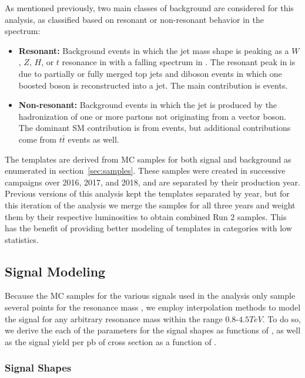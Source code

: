 As mentioned previously, two main classes of background are considered for this analysis, as classified based on resonant or non-resonant behavior in the \MJ spectrum:
\begin{itemize}
  \item \textbf{Resonant:} Background events in which the jet mass shape is peaking as a $W$, $Z$, $H$, or $t$ resonance in \MJ with a falling spectrum in \MVV.
  The resonant peak in \MJ is due to partially or fully merged top jets and diboson events in which one boosted boson is reconstructed into a jet.
  The main contribution is \WVt events.
  \item \textbf{Non-resonant:} Background events in which the jet is produced by the hadronization of one or more partons not originating from a vector boson.
  The dominant SM contribution is from \Wjets events, but additional contributions come from $t\bar{t}$ events as well.
\end{itemize}

The templates are derived from MC samples for both signal and background as enumerated in section~\ref{sec:samples}.
These samples were created in successive campaigns over 2016, 2017, and 2018, and are separated by their production year.
Previous versions of this analysis kept the templates separated by year, but for this iteration of the analysis we merge the samples for all three years and weight them by their respective luminosities to obtain combined Run 2 samples.
This has the benefit of providing better modeling of templates in categories with low statistics.

\subsection{Signal Modeling}
\label{sec:sig}

Because the MC samples for the various signals used in the analysis only sample several points for the resonance mass \MX, we employ interpolation methods to model the signal for any arbitrary resonance mass \MX within the range 0.8-$4.5\unit{TeV}$.
To do so, we derive the each of the parameters for the signal shapes as functions of \MX, as well as the signal yield per pb of cross section as a function of \MX.

\subsubsection{Signal Shapes}

